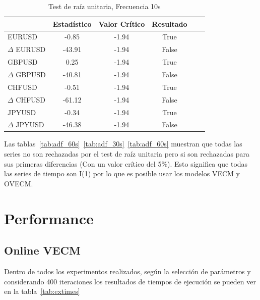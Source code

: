 \begin{table}[h!]
\caption{Test de raíz unitaria, Frecuencia 10s}
\label{tab:adf_10s}
\begin{center}
\begin{tabular}{|l|c|c|c|c|c|}
\hline
& \textbf{Estadístico} & \textbf{Valor Crítico} & \textbf{Resultado}\\
\hline
EURUSD          & -0.85 & -1.94 & True       \\
$\Delta$ EURUSD & -43.91   & -1.94 & False       \\
GBPUSD          & 0.25   & -1.94 & True          \\
$\Delta$ GBPUSD & -40.81   & -1.94 & False       \\
CHFUSD          & -0.51   & -1.94 & True         \\
$\Delta$ CHFUSD & -61.12   & -1.94 & False       \\
JPYUSD          & -0.34 & -1.94 & True        \\
$\Delta$ JPYUSD & -46.38 & -1.94 & False     \\ 
\hline
\end{tabular}
\end{center}
\end{table}

Las tablas~\ref{tab:adf_60s}~\ref{tab:adf_30s}~\ref{tab:adf_60s} muestran que
todas las series no son rechazadas por el test de raíz unitaria pero si son
rechazadas para sus primeras diferencias (Con un valor crítico del 5\%). Esto
significa que todas las series de tiempo son I(1) por lo que es posible usar
los modelos VECM y OVECM. 

\section{Performance}
\subsection{Online VECM}
Dentro de todos los experimentos realizados, según la selección de parámetros
y considerando 400 iteraciones los resultados de tiempos de ejecución se pueden
ver en la tabla~\ref{tab:extimes}

